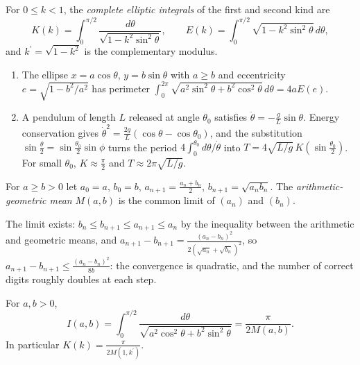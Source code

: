 \begin{definition}\label{special-functions:definition-elliptic-integrals}
For $0 \leq k < 1$, the \emph{complete elliptic integrals} of the first and second kind are
\[
K(k) = \int_0^{\pi/2}\frac{d\theta}{\sqrt{1 - k^2\sin^2\theta}}, \qquad E(k) = \int_0^{\pi/2}\sqrt{1 - k^2\sin^2\theta}\,d\theta,
\]
and $k^{\prime} = \sqrt{1 - k^2}$ is the complementary modulus.
\end{definition}

\begin{example}\label{special-functions:example-elliptic-integrals}
\begin{enumerate}
\item The ellipse $x = a\cos\theta$, $y = b\sin\theta$ with $a \geq b$ and eccentricity $e = \sqrt{1 - b^2/a^2}$ has perimeter $\int_0^{2\pi}\sqrt{a^2\sin^2\theta + b^2\cos^2\theta}\,d\theta = 4aE(e)$.
\item A pendulum of length $L$ released at angle $\theta_0$ satisfies $\ddot\theta = -\frac gL\sin\theta$. Energy conservation gives $\dot\theta^2 = \frac{2g}{L}(\cos\theta - \cos\theta_0)$, and the substitution
$\sin\frac\theta2 = \sin\frac{\theta_0}{2}\sin\phi$ turns the period $4\int_0^{\theta_0}d\theta/\dot\theta$ into $T = 4\sqrt{L/g}\,K(\sin\frac{\theta_0}{2})$. For small $\theta_0$, $K \approx \frac\pi2$ and $T \approx 2\pi\sqrt{L/g}$.
\end{enumerate}
\end{example}

\begin{definition}\label{special-functions:definition-agm}
For $a \geq b > 0$ let $a_0 = a$, $b_0 = b$, $a_{n+1} = \frac{a_n + b_n}{2}$, $b_{n+1} = \sqrt{a_nb_n}$. The \emph{arithmetic-geometric mean} $M(a, b)$ is the common limit of $(a_n)$ and $(b_n)$.
\end{definition}

The limit exists: $b_n \leq b_{n+1} \leq a_{n+1} \leq a_n$ by the inequality between the arithmetic and geometric means, and $a_{n+1} - b_{n+1} = \frac{(a_n - b_n)^2}{2(\sqrt{a_n} + \sqrt{b_n})^2}$, so
$a_{n+1} - b_{n+1} \leq \frac{(a_n - b_n)^2}{8b}$: the convergence is quadratic, and the number of correct digits roughly doubles at each step.

\begin{theorem}[Gauss]\label{special-functions:theorem-agm}
For $a, b > 0$,
\[
I(a, b) = \int_0^{\pi/2}\frac{d\theta}{\sqrt{a^2\cos^2\theta + b^2\sin^2\theta}} = \frac{\pi}{2M(a, b)}.
\]
In particular $K(k) = \frac{\pi}{2M(1, k^{\prime})}$.
\end{theorem}


